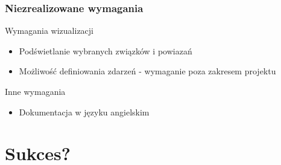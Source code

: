 \documentclass[xcolor=dvipsnames,9pt]{beamer}
\begin{document}
\begin{frame}
	\frametitle{Niezrealizowane wymagania}

	\begin{block}{Wymagania wizualizacji}
		\begin{itemize}
			\item Podświetlanie wybranych związków i powiazań
			 \item Możliwość definiowania zdarzeń - wymaganie poza zakresem projektu
	\end{itemize}
	\end{block}
  	
	\begin{block}{Inne wymagania}
	\begin{itemize}
			\item Dokumentacja w języku angielskim
	\end{itemize}
	\end{block}



\end{frame}

\section{Sukces?}
\end{document}
